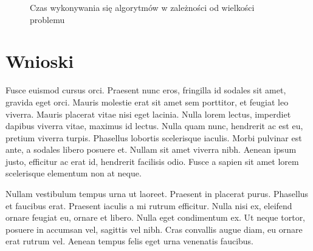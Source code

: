 \documentclass[polish,polish,a4paper]{article}
\begin{document}
    \begin{figure}[h]
\centering
{}
\caption{Czas wykonywania się algorytmów w zależności od wielkości problemu}
\end{figure}
\section{Wnioski}
Fusce euismod cursus orci. Praesent nunc eros, fringilla id sodales sit amet, gravida eget orci. Mauris molestie erat sit amet sem porttitor, et feugiat leo viverra. Mauris placerat vitae nisi eget lacinia. Nulla lorem lectus, imperdiet dapibus viverra vitae, maximus id lectus. Nulla quam nunc, hendrerit ac est eu, pretium viverra turpis. Phasellus lobortis scelerisque iaculis. Morbi pulvinar est ante, a sodales libero posuere et. Nullam sit amet viverra nibh. Aenean ipsum justo, efficitur ac erat id, hendrerit facilisis odio. Fusce a sapien sit amet lorem scelerisque elementum non at neque.

Nullam vestibulum tempus urna ut laoreet. Praesent in placerat purus. Phasellus et faucibus erat. Praesent iaculis a mi rutrum efficitur. Nulla nisi ex, eleifend ornare feugiat eu, ornare et libero. Nulla eget condimentum ex. Ut neque tortor, posuere in accumsan vel, sagittis vel nibh. Cras convallis augue diam, eu ornare erat rutrum vel. Aenean tempus felis eget urna venenatis faucibus.


\end{document}
